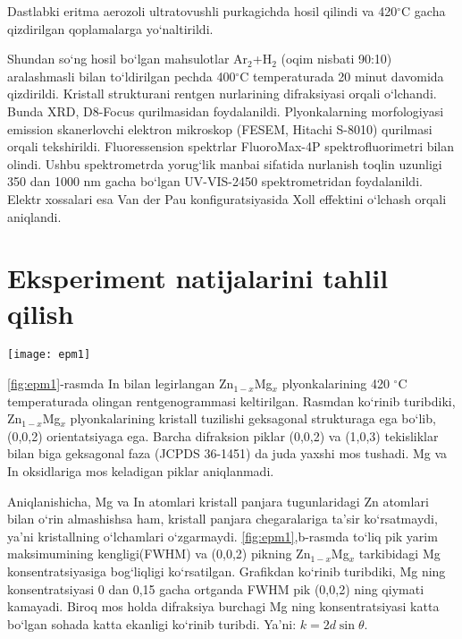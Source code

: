 \documentclass[14pt]{scrarticle}
\begin{document}
	
	Dastlabki eritma aerozoli ultratovushli purkagichda hosil qilindi va 420$^{\circ}$C gacha qizdirilgan qoplamalarga yo`naltirildi. 
	
	Shundan so`ng hosil bo`lgan mahsulotlar Ar$_{2}$+H$_{2}$ (oqim nisbati 90:10) aralashmasli bilan to`ldirilgan pechda 400$^{\circ}$C temperaturada 20 minut davomida qizdirildi. Kristall strukturani rentgen nurlarining difraksiyasi orqali o`lchandi. Bunda XRD, D8-Focus qurilmasidan foydalanildi. Plyonkalarning morfologiyasi emission skanerlovchi elektron mikroskop (FESEM, Hitachi S-8010) qurilmasi orqali tekshirildi. Fluoressension spektrlar FluoroMax-4P spektrofluorimetri bilan olindi. Ushbu spektrometrda yorug`lik manbai sifatida nurlanish toqlin uzunligi 350 dan 1000 nm gacha bo`lgan UV-VIS-2450 spektrometridan foydalanildi. Elektr xossalari esa Van der Pau konfiguratsiyasida Xoll effektini o`lchash orqali aniqlandi. 
		
\section{Eksperiment natijalarini tahlil qilish}

\begin{figure*}[h]
	\centering
	\texttt{[image: epm1]}
	\caption{Zn$_{1-x}$Mg$_{x}$ plyonkalarining rentgenogrammalari. b - yupqa Zn$_{1-x}$Mg$_{x}$ plyonkalarda piklarning Mg konsentratsiyasiga bog`liq ravishda siljishi }
	\label{fig:epm1}
\end{figure*}

\ref{fig:epm1}-rasmda In bilan legirlangan Zn$_{1-x}$Mg$_{x}$ plyonkalarining 420 $^{\circ}$C temperaturada olingan rentgenogrammasi keltirilgan. Rasmdan ko`rinib turibdiki, Zn$_{1-x}$Mg$_{x}$ plyonkalarining kristall tuzilishi geksagonal strukturaga ega bo`lib, (0,0,2) orientatsiyaga ega. Barcha difraksion piklar (0,0,2) va (1,0,3) tekisliklar bilan biga geksagonal faza (JCPDS 36-1451) da juda yaxshi mos tushadi. Mg va In oksidlariga mos keladigan piklar aniqlanmadi. 

Aniqlanishicha, Mg va In atomlari kristall panjara tugunlaridagi Zn atomlari bilan o`rin almashishsa ham, kristall panjara chegaralariga ta'sir ko`rsatmaydi, ya'ni kristallning o`lchamlari o`zgarmaydi. \ref{fig:epm1},b-rasmda to`liq pik yarim maksimumining kengligi(FWHM) va (0,0,2) pikning Zn$_{1-x}$Mg$_{x}$ tarkibidagi Mg konsentratsiyasiga bog`liqligi  ko`rsatilgan. Grafikdan ko`rinib turibdiki, Mg ning konsentratsiyasi 0 dan 0,15 gacha ortganda FWHM pik (0,0,2) ning qiymati kamayadi. Biroq mos holda difraksiya burchagi Mg ning konsentratsiyasi katta bo`lgan sohada katta ekanligi ko`rinib turibdi. Ya'ni: $k=2d\sin\theta$. 
	
\end{document}
